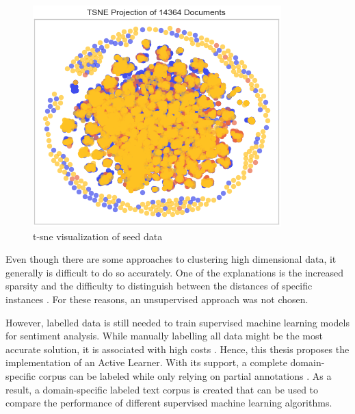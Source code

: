 \documentclass[11pt, a4paper]{article}
\begin{document}
\begin{figure} %
    \centering
    \includegraphics[width=\textwidth]{tsne_projection.png}
    \caption{t-sne visualization of seed data}
    \label{fig:t-sne}
\end{figure}

Even though there are some approaches to clustering high dimensional data, it generally is difficult to do so accurately. 
One of the explanations is the increased sparsity and the difficulty to distinguish between the distances 
of specific instances \citep{tomasev2014roleofhubness}. For these reasons, an unsupervised approach was not chosen.

However, labelled data is still needed to train supervised machine learning models for sentiment analysis. While manually labelling
all data might be the most accurate solution, it is associated with high costs \citep{miller2020activelearningapproaches}.
Hence, this thesis proposes the implementation of an Active Learner. With its support, a complete domain-specific corpus can be labeled while only relying on partial annotations \citep{park2015EfficientExtraction}.
As a result, a domain-specific labeled text corpus is created that can be used to compare the performance of different supervised machine learning algorithms.
\end{document}
